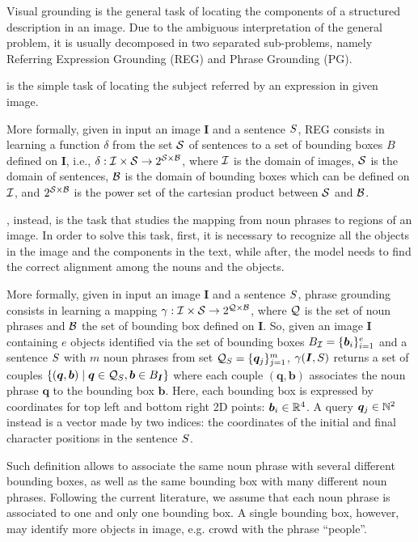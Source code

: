 Visual grounding is the general task of locating the components of a
structured description in an image. Due to the ambiguous
interpretation of the general problem, it is usually decomposed in two
separated sub-problems, namely Referring Expression Grounding (REG)
and Phrase Grounding (PG).

 is the simple task of
locating the subject referred by an expression in given image.

More formally, given in input an image $\bm{I}$ and a sentence
$S$, REG consists in learning a function $\delta$ from the
set $\mathcal{S}$ of sentences to a set of bounding boxes $B$ defined on
$\bm{I}$, i.e., $\delta: \mathcal{I} \times \mathcal{S} \rightarrow 2^{\mathcal{S}
\times \mathcal{B}}$, where $\mathcal{I}$ is the domain of images, $\mathcal{S}$ is the
domain of sentences, $\mathcal{B}$ is the domain of bounding boxes which can
be defined on $\mathcal{I}$, and $2^{\mathcal{S} \times \mathcal{B}}$ is the power set
of the cartesian product between $\mathcal{S}$ and $\mathcal{B}$.

, instead, is the task that studies the
mapping from noun phrases to regions of an image. In order to solve
this task, first, it is necessary to recognize all the objects in the
image and the components in the text, while after, the model needs to
find the correct alignment among the nouns and the objects.

More formally, given in input an image $\bm{I}$ and a sentence
$S$, phrase grounding consists in learning a mapping $\gamma :
\mathcal{I} \times \mathcal{S} \rightarrow 2^{\mathcal{Q} \times \mathcal{B}}$, where $\mathcal{Q}$
is the set of noun phrases and $\mathcal{B}$ the set of bounding box defined
on $\bm{I}$. So, given an image $\bm{I}$ containing $e$ objects
identified via the set of bounding boxes $B_{\mathcal{I}} = \{ \bm{b}_i
\}^e_{i=1}$ and a sentence $S$ with $m$ noun phrases from set
$\mathcal{Q}_{S} = \{ \bm{q}_j \}^m_{j=1}$, $\gamma(\bm{I}, S)$ returns a
set of couples $\{ (\bm{q}, \bm{b}) \mid \bm{q} \in \mathcal{Q}_{S},
\bm{b} \in B_{\bm{I}} \}$ where each couple $(\bm{q}, \bm{b})$
associates the noun phrase $\bm{q}$ to the bounding box $\bm{b}$.
Here, each bounding box is expressed by coordinates for top left and
bottom right 2D points: $\bm{b}_i \in \mathbb{R}^4$. A query $\bm{q}_j \in
\mathbb{N}^2$ instead is a vector made by two indices: the coordinates of
the initial and final character positions in the sentence $S$.

Such definition allows to associate the same noun phrase with several
different bounding boxes, as well as the same bounding box with many
different noun phrases. Following the current literature, we assume
that each noun phrase is associated to one and only one bounding box.
A single bounding box, however, may identify more objects in image,
e.g. crowd with the phrase ``people''.

